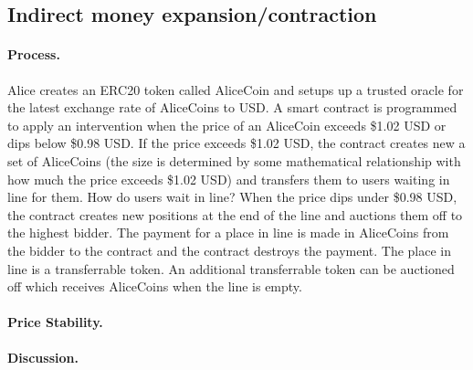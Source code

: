 

\subsection{Indirect money expansion/contraction}

\paragraph{Process.} Alice creates an ERC20 token called AliceCoin and setups up a trusted oracle for the latest exchange rate of AliceCoins to USD. A smart contract is programmed to apply an intervention when the price of an AliceCoin exceeds \$1.02 USD or dips below \$0.98 USD.  If the price exceeds \$1.02 USD, the contract creates new a set of AliceCoins (the size is determined by some mathematical relationship with how much the price exceeds \$1.02 USD) and transfers them to users waiting in line for them. How do users wait in line? When the price dips under \$0.98 USD, the contract creates new positions at the end of the line and auctions them off to the highest bidder. The payment for a place in line is made in AliceCoins from the bidder to the contract and the contract destroys the payment. The place in line is a transferrable token. An additional transferrable token can be auctioned off which receives AliceCoins when the line is empty.


\paragraph{Price Stability.}

\paragraph{Discussion.}


